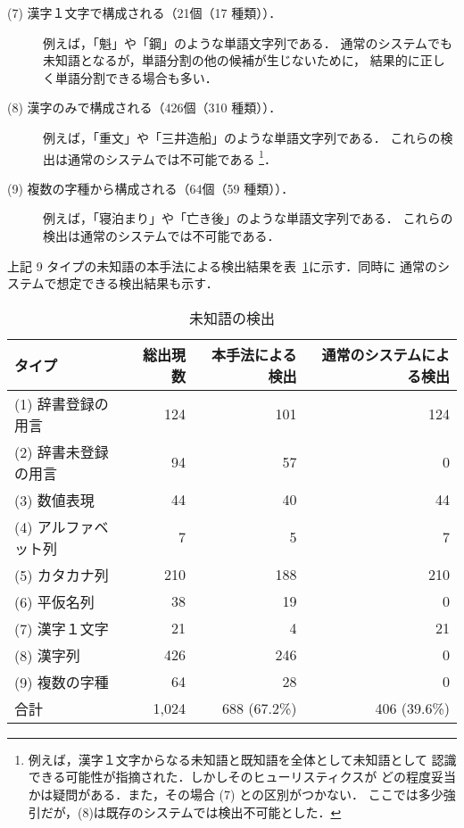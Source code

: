 \begin{description}
\item[(7) 漢字１文字で構成される（21個（17 種類））．]

例えば，「魁」や「鋼」のような単語文字列である．
通常のシステムでも未知語となるが，単語分割の他の候補が生じないために，
結果的に正しく単語分割できる場合も多い．

\item[(8) 漢字のみで構成される（426個（310 種類））．]

例えば，「重文」や「三井造船」のような単語文字列である．
これらの検出は通常のシステムでは不可能である
\footnote{例えば，漢字１文字からなる未知語と既知語を全体として未知語として
認識できる可能性が指摘された．しかしそのヒューリスティクスが
どの程度妥当かは疑問がある．また，その場合 (7) との区別がつかない．
ここでは多少強引だが，(8)は既存のシステムでは検出不可能とした．}．

\item[(9) 複数の字種から構成される（64個（59 種類））．]

例えば，「寝泊まり」や「亡き後」のような単語文字列である．
これらの検出は通常のシステムでは不可能である．

\end{description}

上記 9 タイプの未知語の本手法による検出結果を\mbox{表 \ref{unknown}}に示す．同時に
通常のシステムで想定できる検出結果も示す．

\newpage

\begin{table}[h]
  \begin{center}
    \leavevmode \small
    \caption{未知語の検出}
      \label{unknown}
    \begin{tabular}{|l|r|r|r|} \hline
タイプ              &   総出現数  &  本手法による検出  &  通常のシステムによる検出   \\ \hline \hline
(1) 辞書登録の用言   &   124   &    101             &      124    \\ \hline
(2) 辞書未登録の用言 &    94   &     57             &        0    \\ \hline
(3) 数値表現         &    44   &     40             &       44    \\ \hline
(4) アルファベット列 &     7   &      5             &        7    \\ \hline
(5) カタカナ列       &   210   &    188             &      210    \\ \hline
(6) 平仮名列         &    38   &     19             &        0    \\ \hline
(7) 漢字１文字       &    21   &      4             &       21    \\ \hline
(8) 漢字列           &   426   &    246             &        0    \\ \hline
(9) 複数の字種       &    64   &     28             &        0    \\ \hline \hline
   合計              & 1,024   &    688 (67.2\%)    &      406 (39.6\%)   \\ \hline
    \end{tabular}
  \end{center}
\end{table}


